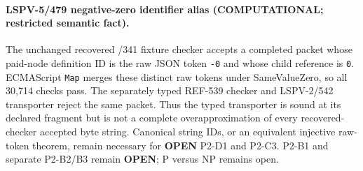 \paragraph{LSPV-5/479 negative-zero identifier alias (COMPUTATIONAL; restricted semantic fact).}
The unchanged recovered /341 fixture checker accepts a completed packet whose paid-node
definition ID is the raw JSON token \texttt{-0} and whose child reference is \texttt{0}.
ECMAScript \texttt{Map} merges these distinct raw tokens under SameValueZero, so all 30,714
checks pass.  The separately typed REF-539 checker and LSPV-2/542 transporter reject the
same packet.  Thus the typed transporter is sound at its declared fragment but is not a
complete overapproximation of every recovered-checker accepted byte string.  Canonical
string IDs, or an equivalent injective raw-token theorem, remain necessary for
\textbf{OPEN} P2-D1 and P2-C3.  P2-B1 and separate P2-B2/B3 remain \textbf{OPEN};
P versus NP remains open.
